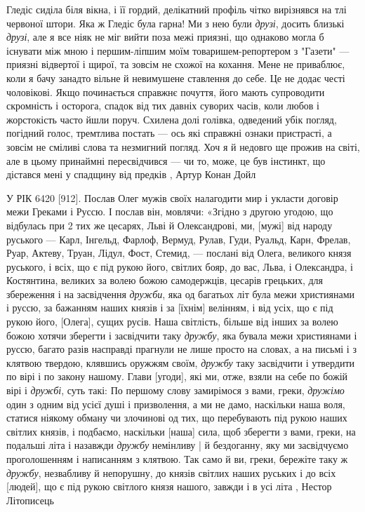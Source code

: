 Гледіс сиділа біля вікна, і її гордий, делікатний профіль чітко вирізнявся на
тлі червоної штори. Яка ж Гледіс була гарна! Ми з нею були \emph{друзі}, досить
близькі \emph{друзі}, але я все ніяк не міг вийти поза межі приязні, що однаково могла
б існувати між мною і першим-ліпшим моїм товаришем-репортером з "Газети" —
приязні відвертої і щирої, та зовсім не схожої на кохання. Мене не приваблює,
коли я бачу занадто вільне й невимушене ставлення до себе. Це не додає честі
чоловікові. Якщо починається справжнє почуття, його мають супроводити
скромність і осторога, спадок від тих давніх суворих часів, коли любов і
жорстокість часто йшли поруч. Схилена долі голівка, одведений убік погляд,
погідний голос, тремтлива постать — ось які справжні ознаки пристрасті, а
зовсім не сміливі слова та незмигний погляд. Хоч я й недовго ще прожив на
світі, але в цьому принаймні пересвідчився — чи то, може, це був інстинкт, що
дістався мені у спадщину від предків
, Артур Конан Дойл

У РІК 6420 [912]. Послав Олег мужів своїх налагодити мир і укласти договір межи
Греками і Руссю. І послав він, мовлячи: «Згідно з другою угодою, що відбулась
при 2 тих же цесарях, Льві й Олександрові, ми, [мужі] від народу руського —
Карл, Інгельд, Фарлоф, Вермуд, Рулав, Гуди, Руальд, Карн, Фрелав, Руар, Актеву,
Труан, Лідул, Фост, Стемид, — послані від Олега, великого князя руського, і
всіх, що є під рукою його, світлих бояр, до вас, Льва, і Олександра, і
Костянтина, великих за волею божою самодержців, цесарів грецьких, для
збереження і на засвідчення \emph{дружби}, яка од багатьох літ була межи християнами і
руссю, за бажанням наших князів і за [їхнім] велінням, і від усіх, що є під
рукою його, [Олега], сущих русів. Наша світлість, більше від інших за волею
божою хотячи зберегти і засвідчити таку \emph{дружбу}, яка бувала межи християнами і
руссю, багато разів насправді прагнули не лише просто на словах, а на письмі і
з клятвою твердою, клявшись оружжям своїм, \emph{дружбу} таку засвідчити і утвердити
по вірі і по закону нашому.  Глави [угоди], які ми, отже, взяли на себе по
божій вірі і \emph{дружбі}, суть такі: По першому слову замирімося з вами, греки,
\emph{дружімо} один з одним від усієї душі і призволення, а ми не дамо, наскільки наша
воля, статися ніякому обману чи злочинові од тих, що перебувають під рукою
наших світлих князів, і подбаємо, наскільки [наша] сила, щоб зберегти з вами,
греки, на подальші літа і назавжди \emph{дружбу} немінливу | й бездоганну, яку ми
засвідчуємо проголошенням і написанням з клятвою. Так само й ви, греки,
бережіте таку ж \emph{дружбу}, незвабливу й непорушну, до князів світлих наших руських
і до всіх [людей], що є під рукою світлого князя нашого, завжди і в усі літа
, Нестор Літописець
